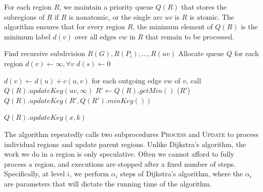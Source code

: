 \documentclass[12pt]{article}
\begin{document}
For each region $R$, we maintain a priority queue $Q(R)$ that stores the subregions of $R$ if $R$ is nonatomic, or the single arc $uv$ is $R$ is atomic. The algorithm ensures that for every region $R$, the minimum element of $Q(R)$ is the minimum label $d(v)$ over all edges $vw$ in $R$ that remain to be processed.

\begin{algorithm}
  \label{alg:linear}
  \begin{algorithmic}[1]
    \State Find recursive subdivision $R(G), R(P_i), \ldots, R(uv)$
    \State Allocate queue $Q$ for each region
    \State $d(v) \gets \infty, \forall v$
    \State $d(s) \gets 0$
      \State {}
    \EndFor
      \State {}
    \EndWhile
  \end{algorithmic}
\end{algorithm}

\begin{algorithm}[!h]
  \label{alg:process}
  \begin{algorithmic}[1]
          \State $d(v) \gets d(u) + c(u,v)$
          \State for each outgoing edge $vw$ of $v$, call 
        \EndIf
        \State $Q(R).updateKey(uv,\infty)$
      \Else
        \Repeat
          \State $R' \gets Q(R).getMin()$
          \State {}($R'$)
          \State $Q(R).updateKey(R',Q(R').minKey())$
      \EndIf
    \EndProcedure
  \end{algorithmic}
\end{algorithm}


\begin{algorithm}[!h]
  \label{alg:update}
  \begin{algorithmic}[1]
      \State $Q(R).updateKey(x,k)$
        \State {}
      \EndIf
    \EndProcedure
  \end{algorithmic}
\end{algorithm}

The algorithm repeatedly calls two subprocedures \textsc{Process} and \textsc{Update} to process individual regions and update parent regions. Unlike Dijkstra's algorithm, the work we do in a region is only speculative. Often we cannot afford to fully process a region, and executions are stopped after a fixed number of steps. Specifically, at level $i$, we perform $\alpha_i$ steps of Dijkstra's algorithm, where the $\alpha_i$ are parameters that will dictate the running time of the algorithm.
\end{document}

